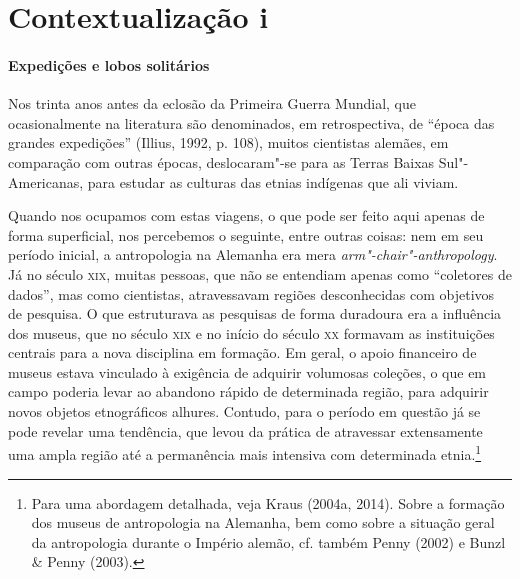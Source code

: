 \section{Contextualização i}
\paragraph{Expedições e lobos solitários} Nos trinta anos antes da eclosão da Primeira Guerra Mundial, que
ocasionalmente na literatura são denominados, em retrospectiva, de
``época das grandes expedições'' (Illius, 1992, p. 108), muitos
cientistas alemães, em comparação com outras épocas, deslocaram"-se para
as Terras Baixas Sul"-Americanas, para estudar as culturas das etnias
indígenas que ali viviam.

Quando nos ocupamos com estas viagens, o que pode ser feito aqui apenas
de forma superficial, nos percebemos o seguinte, entre outras coisas:
nem em seu período inicial, a antropologia na Alemanha era mera
\emph{arm"-chair"-anthropology}. Já no século \textsc{xix}, muitas pessoas, que não
se entendiam apenas como ``coletores de dados'', mas como cientistas,
atravessavam regiões desconhecidas com objetivos de pesquisa. O que
estruturava as pesquisas de forma duradoura era a influência dos
museus, que no século \textsc{xix} e no início do século \textsc{xx} formavam as
instituições centrais para a nova disciplina em formação. Em geral, o
apoio financeiro de museus estava vinculado à exigência de adquirir
volumosas coleções, o que em campo poderia levar ao abandono rápido de
determinada região, para adquirir novos objetos etnográficos alhures.
Contudo, para o período em questão já se pode revelar uma tendência, que
levou da prática de atravessar extensamente uma ampla região até a
permanência mais intensiva com determinada etnia.\footnote{Para uma
  abordagem detalhada, veja Kraus (2004a, 2014). Sobre a formação dos
  museus de antropologia na Alemanha, bem como sobre a situação geral
  da antropologia durante o Império alemão, cf. também Penny (2002) e
  Bunzl \& Penny (2003).}

